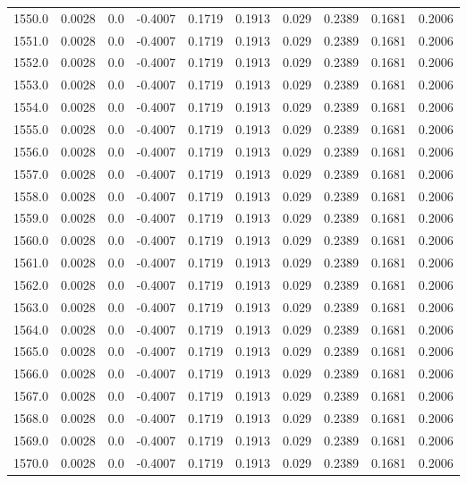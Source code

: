 \begin{longtable}{lrrrrrrrrr}
1550.0 & 0.0028 & 0.0 & -0.4007 & 0.1719 & 0.1913 & 0.029 & 0.2389 & 0.1681 & 0.2006 \\
1551.0 & 0.0028 & 0.0 & -0.4007 & 0.1719 & 0.1913 & 0.029 & 0.2389 & 0.1681 & 0.2006 \\
1552.0 & 0.0028 & 0.0 & -0.4007 & 0.1719 & 0.1913 & 0.029 & 0.2389 & 0.1681 & 0.2006 \\
1553.0 & 0.0028 & 0.0 & -0.4007 & 0.1719 & 0.1913 & 0.029 & 0.2389 & 0.1681 & 0.2006 \\
1554.0 & 0.0028 & 0.0 & -0.4007 & 0.1719 & 0.1913 & 0.029 & 0.2389 & 0.1681 & 0.2006 \\
1555.0 & 0.0028 & 0.0 & -0.4007 & 0.1719 & 0.1913 & 0.029 & 0.2389 & 0.1681 & 0.2006 \\
1556.0 & 0.0028 & 0.0 & -0.4007 & 0.1719 & 0.1913 & 0.029 & 0.2389 & 0.1681 & 0.2006 \\
1557.0 & 0.0028 & 0.0 & -0.4007 & 0.1719 & 0.1913 & 0.029 & 0.2389 & 0.1681 & 0.2006 \\
1558.0 & 0.0028 & 0.0 & -0.4007 & 0.1719 & 0.1913 & 0.029 & 0.2389 & 0.1681 & 0.2006 \\
1559.0 & 0.0028 & 0.0 & -0.4007 & 0.1719 & 0.1913 & 0.029 & 0.2389 & 0.1681 & 0.2006 \\
1560.0 & 0.0028 & 0.0 & -0.4007 & 0.1719 & 0.1913 & 0.029 & 0.2389 & 0.1681 & 0.2006 \\
1561.0 & 0.0028 & 0.0 & -0.4007 & 0.1719 & 0.1913 & 0.029 & 0.2389 & 0.1681 & 0.2006 \\
1562.0 & 0.0028 & 0.0 & -0.4007 & 0.1719 & 0.1913 & 0.029 & 0.2389 & 0.1681 & 0.2006 \\
1563.0 & 0.0028 & 0.0 & -0.4007 & 0.1719 & 0.1913 & 0.029 & 0.2389 & 0.1681 & 0.2006 \\
1564.0 & 0.0028 & 0.0 & -0.4007 & 0.1719 & 0.1913 & 0.029 & 0.2389 & 0.1681 & 0.2006 \\
1565.0 & 0.0028 & 0.0 & -0.4007 & 0.1719 & 0.1913 & 0.029 & 0.2389 & 0.1681 & 0.2006 \\
1566.0 & 0.0028 & 0.0 & -0.4007 & 0.1719 & 0.1913 & 0.029 & 0.2389 & 0.1681 & 0.2006 \\
1567.0 & 0.0028 & 0.0 & -0.4007 & 0.1719 & 0.1913 & 0.029 & 0.2389 & 0.1681 & 0.2006 \\
1568.0 & 0.0028 & 0.0 & -0.4007 & 0.1719 & 0.1913 & 0.029 & 0.2389 & 0.1681 & 0.2006 \\
1569.0 & 0.0028 & 0.0 & -0.4007 & 0.1719 & 0.1913 & 0.029 & 0.2389 & 0.1681 & 0.2006 \\
1570.0 & 0.0028 & 0.0 & -0.4007 & 0.1719 & 0.1913 & 0.029 & 0.2389 & 0.1681 & 0.2006 \\

\end{longtable}
